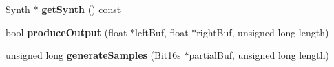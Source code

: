 \begin{DoxyCompactItemize}
\item 
\hypertarget{classMT32Emu_1_1Partial_a3ecaca82ad7f292f31a04d510f334097}{\hyperlink{classMT32Emu_1_1Synth}{Synth} $\ast$ {\bfseries get\-Synth} () const }\label{classMT32Emu_1_1Partial_a3ecaca82ad7f292f31a04d510f334097}

\item 
\hypertarget{classMT32Emu_1_1Partial_a8a68bec71205f9d2c10896c16170752a}{bool {\bfseries produce\-Output} (float $\ast$left\-Buf, float $\ast$right\-Buf, unsigned long length)}\label{classMT32Emu_1_1Partial_a8a68bec71205f9d2c10896c16170752a}

\item 
\hypertarget{classMT32Emu_1_1Partial_a726f17f558ed11f6bb1be132a8e5d1e6}{unsigned long {\bfseries generate\-Samples} (Bit16s $\ast$partial\-Buf, unsigned long length)}\label{classMT32Emu_1_1Partial_a726f17f558ed11f6bb1be132a8e5d1e6}

\end{DoxyCompactItemize}
